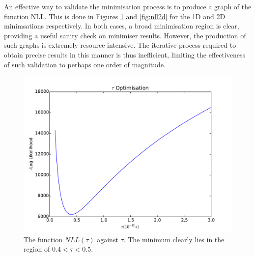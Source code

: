 \documentclass{article}
\begin{document}
An effective way to validate the minimisation process is to produce a graph of the function NLL. This is done in Figures \ref{fig:nll1d} and \ref{fig:nll2d} for the 1D and 2D minimsations respectively. In both cases, a broad minimisation region is clear, providing a useful sanity check on minimiser results. However, the production of such graphs is extremely resource-intensive. The iterative process required to obtain precise results in this manner is thus inefficient, limiting the effectiveness of such validation to perhaps one order of magnitude.

\begin{figure}
\begin{center}
\includegraphics[height=0.3\textheight]{nll}
\caption{The function $NLL(\tau)$ against $\tau$. The minimum clearly lies in the region of $0.4 < \tau < 0.5$.}
\label{fig:nll1d}
\end{center}
\end{figure}
\end{document}
